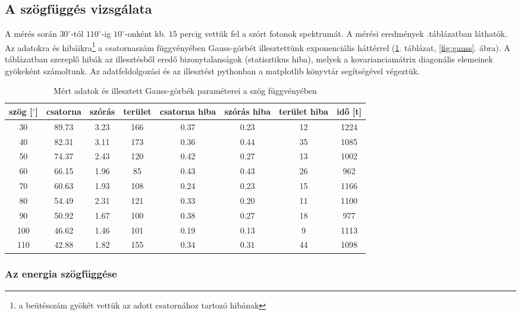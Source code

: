 \documentclass[a4paper,12pt]{article}
\begin{document}
\subsection*{A szögfüggés vizsgálata}
A mérés során $30^\circ$-tól $110^\circ$-ig $10^\circ$-onként kb. $15$ percig vettük fel a szórt fotonok spektrumát. A mérési eredmények .táblázatban láthatók. Az adatokra és hibáikra\footnote{a beütésszám gyökét vettük az adott csatornához tartozó hibának} a csatornaszám függvényében Gauss-görbét illesztettünk exponenciális háttérrel (\ref{table:nyers}. táblázat, \ref{fig:gauss}. ábra). A táblázatban szereplő hibák az illesztésből eredő bizonytalanságok (statisztikus hiba), melyek a kovarianciamátrix diagonális elemeinek gyökeként számoltunk. Az adatfeldolgozási és az illesztést pythonban a matplotlib könyvtár segítségével végeztük.
\begin{table}[h]
\begin{center}
\begin{tabular}{|c|c|c|c|c|c|c|c|}
\hline
szög [$^{\circ}$] & csatorna & szórás & terület & csatorna hiba & szórás hiba & terület hiba & idő [t] \\
\hline
30 & 89.73 & 3.23 & 166 & 0.37 & 0.23 & 12 & 1224 \\
\hline
40 & 82.31 & 3.11 & 173 & 0.36& 0.44 & 35 & 1085 \\
\hline
50 & 74.37 & 2.43 & 120 & 0.42 & 0.27 & 13 & 1002 \\
\hline
60 & 66.15 & 1.96 & 85 & 0.43 & 0.43 & 26 & 962 \\
\hline
70 & 60.63 & 1.93 & 108 & 0.24 & 0.23 & 15 & 1166 \\
\hline
80 & 54.49 & 2.31 & 121 & 0.33 & 0.20 & 11 & 1100 \\
\hline
90 & 50.92 & 1.67 & 100 & 0.38 & 0.27 & 18 & 977 \\
\hline
100 & 46.62 & 1.46 & 101 & 0.19 & 0.13 & 9 & 1113 \\
\hline
110 & 42.88 & 1.82 & 155 & 0.34 & 0.31 & 44 & 1098 \\
\hline

\end{tabular}
\end{center}
\caption{Mért adatok és illesztett Gauss-görbék paraméterei a szög függvényében}
\label{table:nyers}
\end{table}



\subsubsection*{Az energia szögfüggése}
\end{document}
